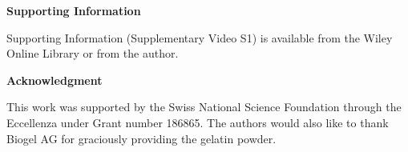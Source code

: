 \medskip
\textbf{Supporting Information} \par %
Supporting Information (Supplementary Video S1) is available from the Wiley Online Library or from the author.



\medskip
\textbf{Acknowledgment} \par %
This work was supported by the Swiss National Science Foundation through the Eccellenza under Grant number 186865. The authors would also like to thank Biogel AG for graciously providing the gelatin powder.
% 
\medskip

%
% 
% 






